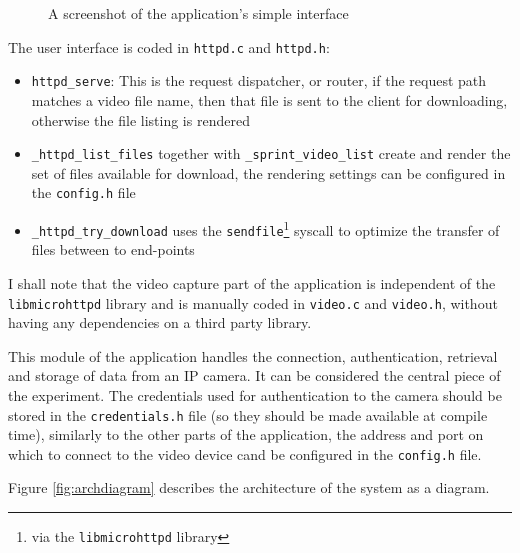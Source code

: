 \documentclass[10pt,a4paper,twoside]{article}
\begin{document}
\begin{figure}
  \centering
  \caption{A screenshot of the application's simple interface}
  \label{fig:interface}
\end{figure}

The user interface is coded in \texttt{httpd.c} and \texttt{httpd.h}:

\begin{itemize}
\item \texttt{httpd\_serve}: This is the request dispatcher, or router, if the request path matches a video file name,
then that file is sent to the client for downloading, otherwise the file listing is rendered
\item \texttt{\_httpd\_list\_files} together with \texttt{\_sprint\_video\_list} create and render the set of files available for download, the rendering settings can be configured in the \texttt{config.h} file
\item \texttt{\_httpd\_try\_download} uses the \texttt{sendfile}\footnote{via the \texttt{libmicrohttpd} library} syscall to optimize the transfer of files between to end-points
\end{itemize}

I shall note that the video capture part of the application is independent of the \texttt{libmicrohttpd} library and is manually coded in \texttt{video.c} and \texttt{video.h}, without having any dependencies on a third party library.

This module of the application handles the connection, authentication, retrieval and storage of data from an IP camera. It can be considered the central piece of the experiment. The credentials used for authentication to the camera should be stored in the \texttt{credentials.h} file (so they should be made available at compile time), similarly to the other parts of the application, the address and port on which to connect to the video device cand be configured in the \texttt{config.h} file.

Figure \ref{fig:archdiagram} describes the architecture of the system as a diagram.
\end{document}
